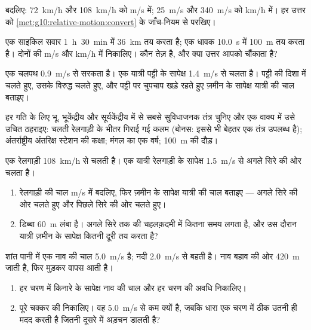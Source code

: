 \begin{exercise}[$\star$]\label{exo:g10:relative-motion:2}
बदलिए: \qty{72}{km/h} और \qty{108}{km/h} को \unit{m/s} में; \qty{25}{m/s} और \qty{340}{m/s} को \unit{km/h}
में। हर उत्तर को \cref{met:g10:relative-motion:convert} के जाँच-नियम से परखिए।
\end{exercise}

\begin{exercise}[$\star$]\label{exo:g10:relative-motion:3}
एक साइकिल सवार \qty{1}{h}~\qty{30}{min} में \qty{36}{km} तय करता है; एक धावक \qty{10.0}{s}
में \qty{100}{m} तय करता है। दोनों की  \unit{m/s} और \unit{km/h} में
निकालिए। कौन तेज़ है, और क्या उत्तर आपको चौंकाता है?
\end{exercise}

\begin{exercise}[$\star$]\label{exo:g10:relative-motion:4}
एक चलपथ \qty{0.9}{m/s} से सरकता है। एक यात्री पट्टी के सापेक्ष \qty{1.4}{m/s} से चलता
है। पट्टी की दिशा में चलते हुए, उसके विरुद्ध चलते हुए, और पट्टी पर चुपचाप
खड़े रहते हुए ज़मीन के सापेक्ष यात्री की चाल बताइए।
\end{exercise}

\begin{exercise}[$\star$]\label{exo:g10:relative-motion:5}
हर गति के लिए भू, भूकेंद्रीय और सूर्यकेंद्रीय में से सबसे सुविधाजनक
तंत्र चुनिए और एक वाक्य में उसे उचित ठहराइए: चलती रेलगाड़ी के भीतर गिराई
गई कलम (बोनस: इससे भी बेहतर एक तंत्र उपलब्ध है); अंतर्राष्ट्रीय अंतरिक्ष
स्टेशन की कक्षा; मंगल का एक वर्ष; \qty{100}{m} की दौड़।
\end{exercise}

\begin{exercise}[$\star\star$]\label{exo:g10:relative-motion:6}
एक रेलगाड़ी \qty{108}{km/h} से चलती है। एक यात्री रेलगाड़ी के सापेक्ष \qty{1.5}{m/s}
से अगले सिरे की ओर चलता है।
\begin{enumerate}
  \item रेलगाड़ी की चाल \unit{m/s} में बदलिए, फिर ज़मीन के सापेक्ष यात्री
        की चाल बताइए --- अगले सिरे की ओर चलते हुए और पिछले सिरे की ओर
        चलते हुए।
  \item डिब्बा \qty{60}{m} लंबा है। अगले सिरे तक की चहलक़दमी में कितना समय
        लगता है, और उस दौरान यात्री ज़मीन के सापेक्ष कितनी दूरी तय करता
        है?
\end{enumerate}
\end{exercise}

\begin{exercise}[$\star\star$]\label{exo:g10:relative-motion:7}
शांत पानी में एक नाव की चाल \qty{5.0}{m/s} है; नदी \qty{2.0}{m/s} से बहती है। नाव
बहाव की ओर \qty{420}{m} जाती है, फिर मुड़कर वापस आती है।
\begin{enumerate}
  \item हर चरण में किनारे के सापेक्ष नाव की चाल और हर चरण की अवधि
        निकालिए।
  \item पूरे चक्कर की  निकालिए। वह \qty{5.0}{m/s} से कम क्यों
        है, जबकि धारा एक चरण में ठीक उतनी ही मदद करती है जितनी दूसरे में
        अड़चन डालती है?
\end{enumerate}
\end{exercise}

